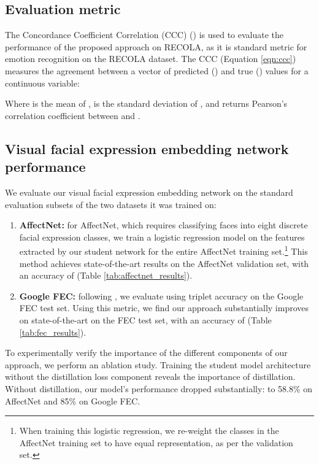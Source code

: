 \documentclass[times,twocolumn,final,authoryear]{elsarticle}
\begin{document}
	\subsection{Evaluation metric}
	\label{sec:ccc}
	The Concordance Coefficient Correlation (CCC) (\cite{lawrence1989}) is used to evaluate the performance of the proposed approach on RECOLA, as it is standard metric for emotion recognition on the RECOLA dataset. The CCC (Equation \ref{eqn:ccc}) measures the agreement between a vector of predicted () and true () values for a continuous variable:
	
	
	
	Where  is the mean of ,  is the standard deviation of , and  returns Pearson's correlation coefficient between  and .
	
	\subsection{Visual facial expression embedding network performance}
	\label{sec:visperf}
	
	We evaluate our visual facial expression embedding network on the standard evaluation subsets of the two datasets it was trained on:
	\begin{enumerate}
		\item \textbf{AffectNet:} for AffectNet, which requires classifying faces into eight discrete facial expression classes, we train a logistic regression model on the features extracted by our student network for the entire AffectNet training set.\footnote{When training this logistic regression, we re-weight the classes in the AffectNet training set to have equal representation, as per the validation set.} This method achieves state-of-the-art results on the AffectNet validation set, with an accuracy of  (Table \ref{tab:affectnet_results}).
		\item \textbf{Google FEC:} following \cite{GoogleFEC}, we evaluate using triplet accuracy on the Google FEC test set. Using this metric, we find our approach substantially improves on state-of-the-art on the FEC test set, with an accuracy of  (Table \ref{tab:fec_results}).
	\end{enumerate}
	
	To experimentally verify the importance of the different components of our approach, we perform an ablation study. Training the student model architecture without the distillation loss component reveals the importance of distillation. Without distillation, our model's performance dropped substantially: to 58.8\% on AffectNet and 85\% on Google FEC.
	
\end{document}
